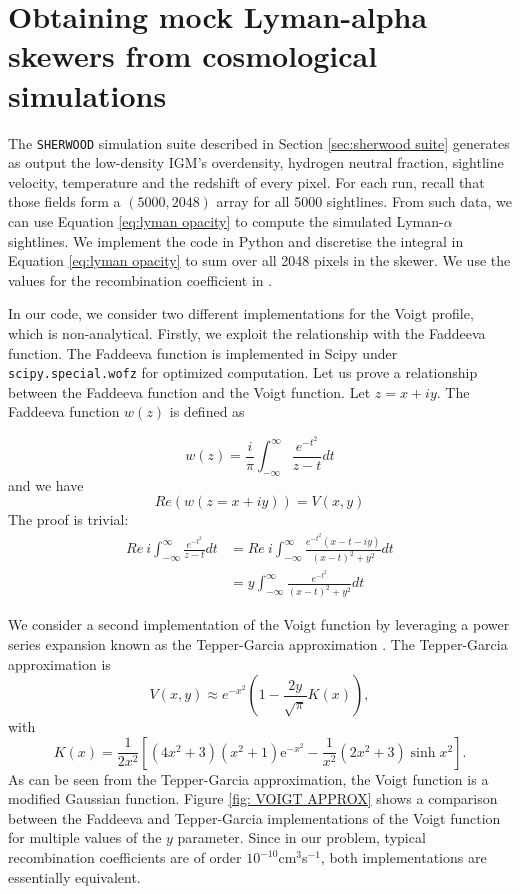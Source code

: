 \section{Obtaining mock Lyman-alpha skewers from cosmological simulations}
The \texttt{SHERWOOD} simulation suite described in Section \ref{sec:sherwood suite} generates as output the low-density IGM's overdensity, hydrogen neutral fraction, sightline velocity, temperature and the redshift of every pixel. For each run, recall that those fields form a $(5000,2048)$ array for all 5000 sightlines. From such data, we can use Equation \ref{eq:lyman opacity} to compute the simulated Lyman-$\alpha$ sightlines. We implement the code in Python and discretise the integral in Equation \ref{eq:lyman opacity} to sum over all 2048 pixels in the skewer. We use the values for the recombination coefficient in \cite{Luki__2014}.

In our code, we consider two different implementations for the Voigt profile, which is non-analytical. Firstly, we exploit the relationship with the Faddeeva function. The Faddeeva function is implemented in Scipy under \texttt{scipy.special.wofz} for optimized computation. Let us prove a relationship between the Faddeeva function and the Voigt function. Let $z=x+iy$.
The Faddeeva function $w(z)$ is defined as

\begin{equation}
    w(z)=\frac{i}{\pi} \int_{-\infty}^{\infty} \frac{e^{-t^2}}{z-t}dt
\end{equation}
and we have 
\begin{equation}\label{eq:FAD}
    Re \left( w(z=x+iy) \right)=V(x,y)
\end{equation}
The proof is trivial:
\begin{equation}
    \begin{split}
        Re\ i \int_{-\infty}^{\infty} \frac{e^{-t^2}}{z-t}dt
        &= Re\ i \int_{-\infty}^{\infty} \frac{e^{-t^2} (x-t-iy)}{(x-t)^2+y^2}dt\\
        &=y\int_{-\infty}^{\infty} \frac{e^{-t^2}}{(x-t)^2+y^2}dt
    \end{split}
\end{equation}

We consider a second implementation of the Voigt function by leveraging a power series expansion known as the Tepper-Garcia approximation \cite{Tepper_Garc_a_2006}. The Tepper-Garcia approximation is
\begin{equation}\label{eq:Tepper}
        V(x,y)\approx e^{-x^2}\left( 1-\frac{2y}{\sqrt{\pi}} K(x) \right),
\end{equation}
with
\begin{equation}
        K(x)=\frac1{2x^2}\left[(4x^2+3)\left(x^2+1\right)\mathrm{e}^{-x^2}-\frac1{x^2}(2x^2+3)\sinh x^2\right].
\end{equation}
As can be seen from the Tepper-Garcia approximation, the Voigt function is a modified Gaussian function. Figure \ref{fig: VOIGT APPROX} shows a comparison between the Faddeeva and Tepper-Garcia implementations of the Voigt function for multiple values of the $y$ parameter. Since in our problem, typical recombination coefficients are of order $10^{-10}$cm$^3$s$^{-1}$, both implementations are essentially equivalent.

